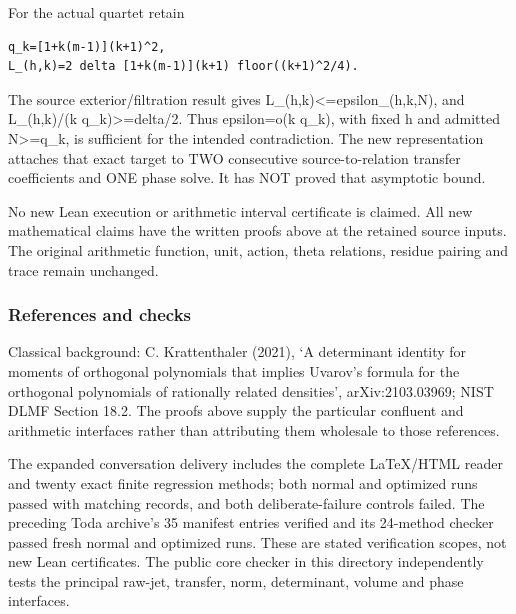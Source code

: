 For the actual quartet retain

\begin{verbatim}
q_k=[1+k(m-1)](k+1)^2,
L_(h,k)=2 delta [1+k(m-1)](k+1) floor((k+1)^2/4).
\end{verbatim}

The source exterior/filtration result gives L\_(h,k)\textless=epsilon\_(h,k,N), and L\_(h,k)/(k q\_k)\textgreater=delta/2. Thus epsilon=o(k q\_k), with fixed h and admitted N\textgreater=q\_k, is sufficient for the intended contradiction. The new representation attaches that exact target to TWO consecutive source-to-relation transfer coefficients and ONE phase solve. It has NOT proved that asymptotic bound.

No new Lean execution or arithmetic interval certificate is claimed. All new mathematical claims have the written proofs above at the retained source inputs. The original arithmetic function, unit, action, theta relations, residue pairing and trace remain unchanged.

\subsubsection{References and checks}\label{endpoint-pr24_current_corrected--references-and-checks}

Classical background: C. Krattenthaler (2021), `A determinant identity for moments of orthogonal polynomials that implies Uvarov's formula for the orthogonal polynomials of rationally related densities', arXiv:2103.03969; NIST DLMF Section 18.2. The proofs above supply the particular confluent and arithmetic interfaces rather than attributing them wholesale to those references.

The expanded conversation delivery includes the complete LaTeX/HTML reader and twenty exact finite regression methods; both normal and optimized runs passed with matching records, and both deliberate-failure controls failed. The preceding Toda archive's 35 manifest entries verified and its 24-method checker passed fresh normal and optimized runs. These are stated verification scopes, not new Lean certificates. The public core checker in this directory independently tests the principal raw-jet, transfer, norm, determinant, volume and phase interfaces.
